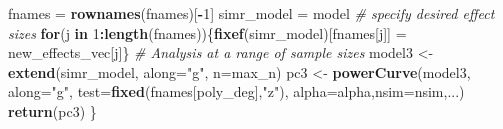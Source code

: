 \documentclass[]{article}
\newenvironment{Shaded}{\begin{snugshade}}{\end{snugshade}}
\newcommand{\KeywordTok}[1]{\textcolor[rgb]{0.13,0.29,0.53}{\textbf{#1}}}
\newcommand{\DataTypeTok}[1]{\textcolor[rgb]{0.13,0.29,0.53}{#1}}
\newcommand{\DecValTok}[1]{\textcolor[rgb]{0.00,0.00,0.81}{#1}}
\newcommand{\StringTok}[1]{\textcolor[rgb]{0.31,0.60,0.02}{#1}}
\newcommand{\CommentTok}[1]{\textcolor[rgb]{0.56,0.35,0.01}{\textit{#1}}}
\newcommand{\ControlFlowTok}[1]{\textcolor[rgb]{0.13,0.29,0.53}{\textbf{#1}}}
\newcommand{\OperatorTok}[1]{\textcolor[rgb]{0.81,0.36,0.00}{\textbf{#1}}}
\newcommand{\NormalTok}[1]{#1}
\begin{document}
\begin{Shaded}
\begin{Highlighting}[]
\NormalTok{ fnames =}\StringTok{ }\KeywordTok{rownames}\NormalTok{(fnames)[}\OperatorTok{-}\DecValTok{1}\NormalTok{]}
\NormalTok{ simr_model =}\StringTok{ }\NormalTok{model}
 \CommentTok{# specify desired effect sizes}
 \ControlFlowTok{for}\NormalTok{(j }\ControlFlowTok{in} \DecValTok{1}\OperatorTok{:}\KeywordTok{length}\NormalTok{(fnames))\{}\KeywordTok{fixef}\NormalTok{(simr_model)[fnames[j]] =}\StringTok{ }\NormalTok{new_effects_vec[j]\}}
 \CommentTok{# Analysis at a range of sample sizes}
\NormalTok{ model3 <-}\StringTok{ }\KeywordTok{extend}\NormalTok{(simr_model, }\DataTypeTok{along=}\StringTok{"g"}\NormalTok{, }\DataTypeTok{n=}\NormalTok{max_n)}
\NormalTok{ pc3 <-}\StringTok{ }\KeywordTok{powerCurve}\NormalTok{(model3, }\DataTypeTok{along=}\StringTok{"g"}\NormalTok{,}
                   \DataTypeTok{test=}\KeywordTok{fixed}\NormalTok{(fnames[poly_deg],}\StringTok{"z"}\NormalTok{),}
                   \DataTypeTok{alpha=}\NormalTok{alpha,}\DataTypeTok{nsim=}\NormalTok{nsim,...)}
 \KeywordTok{return}\NormalTok{(pc3)}
\NormalTok{\}}


\end{Highlighting}
\end{Shaded}
\end{document}
